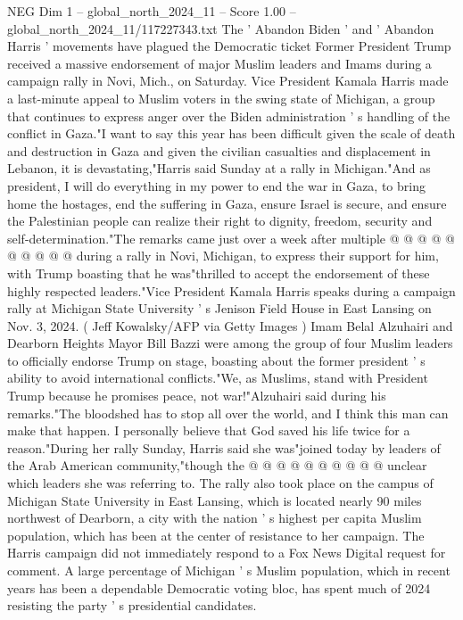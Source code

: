 \begin{textsample}{NEG Dim 1 – global\_north\_2024\_11 – Score 1.00 – global\_north\_2024\_11/117227343.txt}  \label{ex:f1_neg_115}
The ' Abandon Biden ' and ' Abandon Harris ' movements have plagued the Democratic ticket Former President Trump received a massive endorsement of major Muslim leaders and Imams during a campaign rally in Novi, Mich., on Saturday.
Vice President Kamala Harris made a last-minute appeal to Muslim voters in the swing state of Michigan, a group that continues to express anger over the Biden administration ' s handling of the conflict in Gaza."I want to say this year has been difficult given the scale of death and destruction in Gaza and given the civilian casualties and displacement in Lebanon, it is devastating,"Harris said Sunday at a rally in Michigan."And as president, I will do everything in my power to end the war in Gaza, to bring home the hostages, end the suffering in Gaza, ensure Israel is secure, and ensure the Palestinian people can realize their right to dignity, freedom, security and self-determination."The remarks came just over a week after multiple @ @ @ @ @ @ @ @ @ @ during a rally in Novi, Michigan, to express their support for him, with Trump boasting that he was"thrilled to accept the endorsement of these highly respected leaders."Vice President Kamala Harris speaks during a campaign rally at Michigan State University ' s Jenison Field House in East Lansing on Nov. 3, 2024. ( Jeff Kowalsky/AFP via Getty Images ) Imam Belal Alzuhairi and Dearborn Heights Mayor Bill Bazzi were among the group of four Muslim leaders to officially endorse Trump on stage, boasting about the former president ' s ability to avoid international conflicts."We, as Muslims, stand with President Trump because he promises peace, not war!"Alzuhairi said during his remarks."The bloodshed has to stop all over the world, and I think this man can make that happen.
I personally believe that God saved his life twice for a reason."During her rally Sunday, Harris said she was"joined today by leaders of the Arab American community,"though the @ @ @ @ @ @ @ @ @ @ unclear which leaders she was referring to.
The rally also took place on the campus of Michigan State University in East Lansing, which is located nearly 90 miles northwest of Dearborn, a city with the nation ' s highest per capita Muslim population, which has been at the center of resistance to her campaign.
The Harris campaign did not immediately respond to a Fox News Digital request for comment.
A large percentage of Michigan ' s Muslim population, which in recent years has been a dependable Democratic voting bloc, has spent much of 2024 resisting the party ' s presidential candidates.

\end{textsample}
